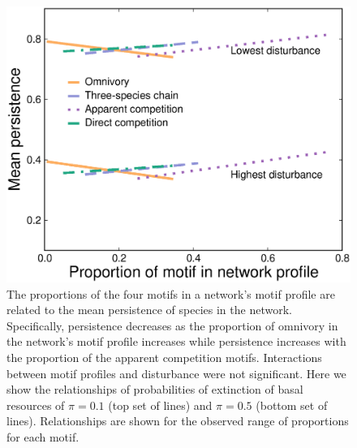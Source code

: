 \documentclass[12pt]{article}
\begin{document}
\begin{spacing}{2.0}
    \begin{figure}[hb!]
        \centering
        \includegraphics[width=\textwidth]{figures/persistence_motif_profiles.eps}
        \caption{The proportions of the four motifs in a network's motif profile are related to the mean persistence of species in the network. Specifically, persistence decreases as the proportion of omnivory in the network's motif profile increases while persistence increases with the proportion of the apparent competition motifs. Interactions between motif profiles and disturbance were not significant. Here we show the relationships of probabilities of extinction of basal resources of $\pi=0.1$ (top set of lines) and $\pi=0.5$ (bottom set of lines). Relationships are shown for the observed range of proportions for each motif.}      
        \label{fig:motif_profile_persistence}
    \end{figure}    
    

\end{spacing}
\end{document}
